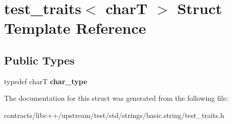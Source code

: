 \hypertarget{structtest__traits}{}\section{test\+\_\+traits$<$ charT $>$ Struct Template Reference}
\label{structtest__traits}
\subsection*{Public Types}
\begin{DoxyCompactItemize}
\item 
\mbox{\label{structtest__traits_a9de9fe795e233a2df3fd22bb92df6150}} 
typedef charT {\bfseries char\+\_\+type}
\end{DoxyCompactItemize}


The documentation for this struct was generated from the following file\+:\begin{DoxyCompactItemize}
\item 
contracts/libc++/upstream/test/std/strings/basic.\+string/test\+\_\+traits.\+h\end{DoxyCompactItemize}
